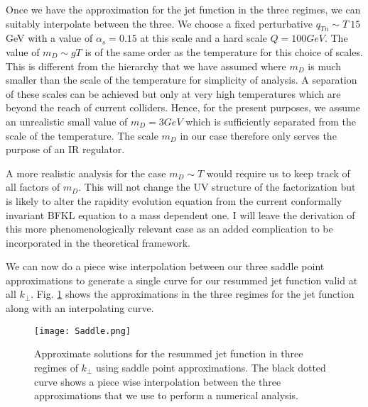 \documentclass[letter,11pt]{article}
\begin{document}
Once we have the approximation for the jet function in the three regimes, we can suitably interpolate between the three.
We choose a fixed perturbative $q_{Tn} \sim T~ 15$GeV with a value of $\alpha_s = 0.15$ at this scale and a hard scale $Q = 100 GeV$. The value of $m_D \sim gT$ is of the same order as the temperature for this choice of scales. This is different from the hierarchy that we have assumed where $m_D$ is much smaller than the scale of the temperature for simplicity of analysis. A separation of these scales can be achieved but only at very high temperatures which are beyond the reach of current colliders. Hence, for the present purposes, we assume an unrealistic small value of $m_D = 3GeV$ which is sufficiently separated from the scale of the temperature. The scale $m_D$ in our case therefore only serves the purpose of an IR regulator.

A more realistic analysis for the case $m_D \sim T$ would require us to keep track of all factors of $m_D$. This will not change the UV structure of the factorization but is likely to alter the rapidity evolution equation from the current conformally invariant BFKL equation to a mass dependent one. I will leave the derivation of this more phenomenologically relevant case as an added complication to be incorporated in the theoretical framework.

We can now do a piece wise interpolation between our three saddle point approximations to generate a single curve for our resummed jet function valid at all $k_{\perp}$. Fig. \ref{inter} shows the approximations in the three regimes for the jet function along with an interpolating curve. 

\begin{figure}
\centering
  \texttt{[image: Saddle.png]}
  \caption{Approximate solutions for the resummed jet function in three regimes of $k_{\perp}$ using saddle point approximations. The black dotted curve shows a piece wise interpolation between the three approximations that we use to perform a numerical analysis.}
  \label{inter}
\end{figure}
\end{document}
